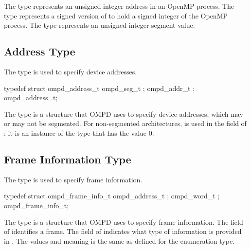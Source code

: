 \descr
The  type represents an unsigned integer address in an
OpenMP process. The  type represents a signed version of 
 to hold a signed integer of the OpenMP process. The 
 type represents an unsigned integer segment value.



\subsection{Address Type}
\label{subsubsubsec:ompd_address_t}

\summary
The  type is used to specify device addresses.

\format
\begin{ccppspecific}
\begin{ompEnv}
typedef struct ompd_address_t {
  ompd_seg_t ;
  ompd_addr_t ;
} ompd_address_t;
\end{ompEnv}
\end{ccppspecific}

\descr
The  type is a structure that OMPD uses to specify 
device addresses, which may or may not be segmented. For non-segmented 
architectures,  is used in the  
field of ; it is an instance of the  
type that has the value 0.

\subsection{Frame Information Type}
\label{subsubsubsec:ompd_frame_info_t}

\summary
The  type is used to specify frame information.

\format
\begin{ccppspecific}
\begin{ompEnv}
typedef struct ompd_frame_info_t {
  ompd_address_t ;
  ompd_word_t ;
} ompd_frame_info_t;
\end{ompEnv}
\end{ccppspecific}

\descr
The  type is a structure that OMPD uses to specify 
frame information. The  field of  
identifies a frame.
The  field of  indicates what type
of information is provided in . The values and meaning is
the same as defined for the  enumeration type.

